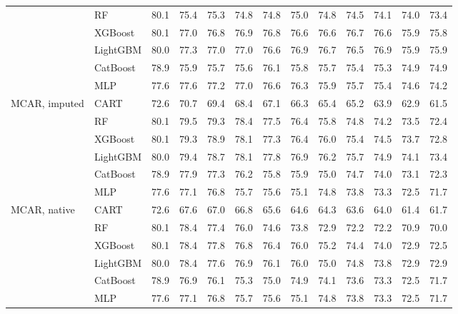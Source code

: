 \documentclass[pdflatex,sn-mathphys]{sn-jnl}
\theoremstyle{thmstyleone}
\begin{document}
\begin{table}[htbp]
\begin{tabular}{@{}llrrrrrrrrrrr@{}}
 & RF & 80.1 & 75.4 & 75.3 & 74.8 & 74.8 & 75.0 & 74.8 & 74.5 & 74.1 & 74.0 & 73.4 \\
 & XGBoost & 80.1 & 77.0 & 76.8 & 76.9 & 76.8 & 76.6 & 76.6 & 76.7 & 76.6 & 75.9 & 75.8 \\
 & LightGBM & 80.0 & 77.3 & 77.0 & 77.0 & 76.6 & 76.9 & 76.7 & 76.5 & 76.9 & 75.9 & 75.9 \\
 & CatBoost & 78.9 & 75.9 & 75.7 & 75.6 & 76.1 & 75.8 & 75.7 & 75.4 & 75.3 & 74.9 & 74.9 \\
 & MLP & 77.6 & 77.6 & 77.2 & 77.0 & 76.6 & 76.3 & 75.9 & 75.7 & 75.4 & 74.6 & 74.2 \\
\midrule
MCAR, imputed & CART & 72.6 & 70.7 & 69.4 & 68.4 & 67.1 & 66.3 & 65.4 & 65.2 & 63.9 & 62.9 & 61.5 \\
 & RF & 80.1 & 79.5 & 79.3 & 78.4 & 77.5 & 76.4 & 75.8 & 74.8 & 74.2 & 73.5 & 72.4 \\
 & XGBoost & 80.1 & 79.3 & 78.9 & 78.1 & 77.3 & 76.4 & 76.0 & 75.4 & 74.5 & 73.7 & 72.8 \\
 & LightGBM & 80.0 & 79.4 & 78.7 & 78.1 & 77.8 & 76.9 & 76.2 & 75.7 & 74.9 & 74.1 & 73.4 \\
 & CatBoost & 78.9 & 77.9 & 77.3 & 76.2 & 75.8 & 75.9 & 75.0 & 74.7 & 74.0 & 73.1 & 72.3 \\
 & MLP & 77.6 & 77.1 & 76.8 & 75.7 & 75.6 & 75.1 & 74.8 & 73.8 & 73.3 & 72.5 & 71.7 \\
\midrule
MCAR, native & CART & 72.6 & 67.6 & 67.0 & 66.8 & 65.6 & 64.6 & 64.3 & 63.6 & 64.0 & 61.4 & 61.7 \\
 & RF & 80.1 & 78.4 & 77.4 & 76.0 & 74.6 & 73.8 & 72.9 & 72.2 & 72.2 & 70.9 & 70.0 \\
 & XGBoost & 80.1 & 78.4 & 77.8 & 76.8 & 76.4 & 76.0 & 75.2 & 74.4 & 74.0 & 72.9 & 72.5 \\
 & LightGBM & 80.0 & 78.4 & 77.6 & 76.9 & 76.1 & 76.0 & 75.0 & 74.8 & 73.8 & 72.9 & 72.9 \\
 & CatBoost & 78.9 & 76.9 & 76.1 & 75.3 & 75.0 & 74.9 & 74.1 & 73.6 & 73.3 & 72.5 & 71.7 \\
 & MLP & 77.6 & 77.1 & 76.8 & 75.7 & 75.6 & 75.1 & 74.8 & 73.8 & 73.3 & 72.5 & 71.7 \\
\bottomrule
\end{tabular}
\end{table}
\end{document}
